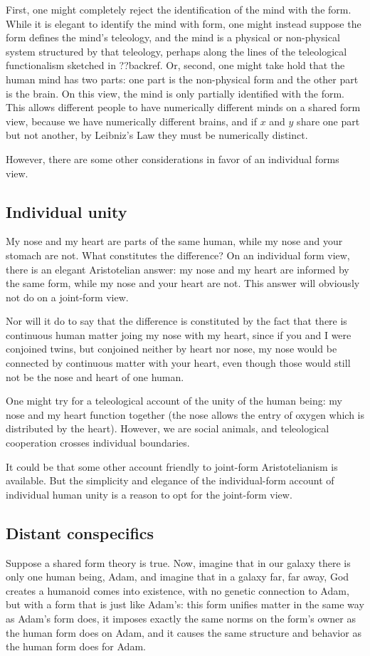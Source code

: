 First, one might completely reject the identification of the mind with the form. While it is elegant to identify the mind with 
form, one might instead suppose the form defines the mind's teleology, and the mind is a physical or non-physical system 
structured by that teleology, perhaps along the lines of the teleological functionalism sketched in ??backref. Or, second,
one might take hold that the human mind has two parts: one part is the non-physical form and the other part is the brain.
On this view, the mind is only partially identified with the form. This allows different people to have numerically different
minds on a shared form view, because we have numerically different brains, and if $x$ and $y$ share one part but not another,
by Leibniz's Law they must be numerically distinct. 

However, there are some other considerations in favor of an individual forms view.

\subsection{Individual unity}
My nose and my heart are parts of the same human, while my nose and your stomach are not. What constitutes the 
difference? On an individual form view, there is an elegant Aristotelian answer: my nose and my heart are informed by the same
form, while my nose and your heart are not. This answer will obviously not do on a joint-form view.

Nor will it do to say that the difference is constituted by the fact that there is continuous human matter joing my nose with my
heart, since if you and I were conjoined twins, but conjoined neither by heart nor nose, my nose would be connected by continuous
matter with your heart, even though those would still not be the nose and heart of one human. 

One might try for a teleological account of the unity of the human being: my nose and my heart function together (the nose 
allows the entry of oxygen which is distributed by the heart). However, we are social animals, and teleological cooperation
crosses individual boundaries.

It could be that some other account friendly to joint-form Aristotelianism is available. But the simplicity and elegance of the
individual-form account of individual human unity is a reason to opt for the joint-form view.

\subsection{Distant conspecifics}
Suppose a shared form theory is true. Now, imagine that in our galaxy there is only one human being, Adam, and imagine that in 
a galaxy far, far away, God creates a humanoid comes into existence, with no genetic connection to Adam, but with a form that 
is just like Adam's: this form unifies matter in the same way as
Adam's form does, it imposes exactly the same norms on the form's owner as the human form does on Adam, and it causes the same
structure and behavior as the human form does for Adam. 

